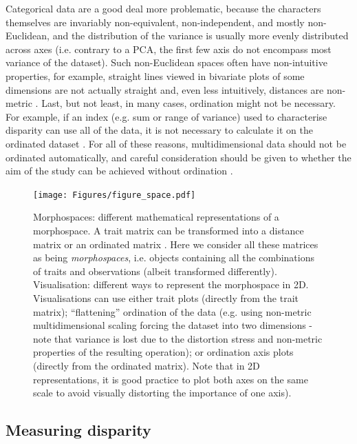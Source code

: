 \documentclass[12pt,letterpaper]{article}
\begin{document}
Categorical data are a good deal more problematic, because the characters themselves are invariably non-equivalent, non-independent, and mostly non-Euclidean, and the distribution of the variance is usually more evenly distributed across axes (i.e. contrary to a PCA, the first few axis do not encompass most variance of the dataset).
Such non-Euclidean spaces often have non-intuitive properties, for example, straight lines viewed in bivariate plots of some dimensions are not actually straight and, even less intuitively, distances are non-metric \citep[i.e. the distance between A and B is not equal to the distance between B and A][]{Gerber2014-ol}.
Last, but not least, in many cases, ordination might not be necessary.
For example, if an index (e.g. sum or range of variance) used to characterise disparity can use all of the data, it is not necessary to calculate it on the ordinated dataset \citep{Close2015-qi}.
For all of these reasons, multidimensional data should not be ordinated automatically, and careful consideration should be given to whether the aim of the study can be achieved without ordination \citep{lloyd2016,lloyd2018}.


\begin{figure}[!htbp]
\centering
   \texttt{[image: Figures/figure\_space.pdf]}
\caption{
    \tiny{
    Morphospaces: different mathematical representations of a morphospace.
    A trait matrix can be transformed into a distance matrix \citep[e.g in][]{Close2015-qi} or an ordinated matrix \citep[e.g. in][]{Brusatte2008-vx}.
    Here we consider all these matrices as being \textit{morphospaces}, i.e. objects containing all the combinations of traits and observations (albeit transformed differently).
    Visualisation: different  ways to represent the morphospace in 2D.
    Visualisations can use either trait plots (directly from the trait matrix); ``flattening'' ordination of the data (e.g. using non-metric multidimensional scaling forcing the dataset into two dimensions - note that variance is lost due to the distortion stress and non-metric properties of the resulting operation); or ordination axis plots (directly from the ordinated matrix).
    Note that in 2D representations, it is good practice to plot both axes on the same scale to avoid visually distorting the importance of one axis).
    }
}
\label{Fig:morphospace}
\end{figure}

\subsection{Measuring disparity} \label{section:metrics}
\end{document}
